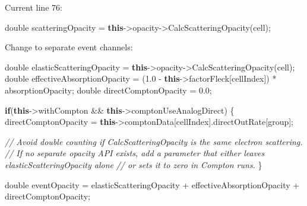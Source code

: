 \documentclass[
]{article}
\newenvironment{Shaded}{}{}
\newcommand{\CommentTok}[1]{\textcolor[rgb]{0.38,0.63,0.69}{\textit{#1}}}
\newcommand{\ControlFlowTok}[1]{\textcolor[rgb]{0.00,0.44,0.13}{\textbf{#1}}}
\newcommand{\DataTypeTok}[1]{\textcolor[rgb]{0.56,0.13,0.00}{#1}}
\newcommand{\FloatTok}[1]{\textcolor[rgb]{0.25,0.63,0.44}{#1}}
\newcommand{\KeywordTok}[1]{\textcolor[rgb]{0.00,0.44,0.13}{\textbf{#1}}}
\newcommand{\NormalTok}[1]{#1}
\newcommand{\OperatorTok}[1]{\textcolor[rgb]{0.40,0.40,0.40}{#1}}
\begin{document}
Current line 76:

\begin{Shaded}
\begin{Highlighting}[]
\DataTypeTok{double}\NormalTok{ scatteringOpacity }\OperatorTok{=} \KeywordTok{this}\OperatorTok{{-}\textgreater{}}\NormalTok{opacity}\OperatorTok{{-}\textgreater{}}\NormalTok{CalcScatteringOpacity}\OperatorTok{(}\NormalTok{cell}\OperatorTok{);}
\end{Highlighting}
\end{Shaded}

Change to separate event channels:

\begin{Shaded}
\begin{Highlighting}[]
\DataTypeTok{double}\NormalTok{ elasticScatteringOpacity }\OperatorTok{=} \KeywordTok{this}\OperatorTok{{-}\textgreater{}}\NormalTok{opacity}\OperatorTok{{-}\textgreater{}}\NormalTok{CalcScatteringOpacity}\OperatorTok{(}\NormalTok{cell}\OperatorTok{);}
\DataTypeTok{double}\NormalTok{ effectiveAbsorptionOpacity }\OperatorTok{=} \OperatorTok{(}\FloatTok{1.0} \OperatorTok{{-}} \KeywordTok{this}\OperatorTok{{-}\textgreater{}}\NormalTok{factorFleck}\OperatorTok{[}\NormalTok{cellIndex}\OperatorTok{])} \OperatorTok{*}\NormalTok{ absorptionOpacity}\OperatorTok{;}
\DataTypeTok{double}\NormalTok{ directComptonOpacity }\OperatorTok{=} \FloatTok{0.0}\OperatorTok{;}

\ControlFlowTok{if}\OperatorTok{(}\KeywordTok{this}\OperatorTok{{-}\textgreater{}}\NormalTok{withCompton }\OperatorTok{\&\&} \KeywordTok{this}\OperatorTok{{-}\textgreater{}}\NormalTok{comptonUseAnalogDirect}\OperatorTok{)}
\OperatorTok{\{}
\NormalTok{    directComptonOpacity }\OperatorTok{=} \KeywordTok{this}\OperatorTok{{-}\textgreater{}}\NormalTok{comptonData}\OperatorTok{[}\NormalTok{cellIndex}\OperatorTok{].}\NormalTok{directOutRate}\OperatorTok{[}\NormalTok{group}\OperatorTok{];}

    \CommentTok{// Avoid double counting if CalcScatteringOpacity is the same electron scattering.}
    \CommentTok{// If no separate opacity API exists, add a parameter that either leaves elasticScatteringOpacity alone}
    \CommentTok{// or sets it to zero in Compton runs.}
\OperatorTok{\}}

\DataTypeTok{double}\NormalTok{ eventOpacity }\OperatorTok{=}\NormalTok{ elasticScatteringOpacity }\OperatorTok{+}\NormalTok{ effectiveAbsorptionOpacity }\OperatorTok{+}\NormalTok{ directComptonOpacity}\OperatorTok{;}
\end{Highlighting}
\end{Shaded}
\end{document}
